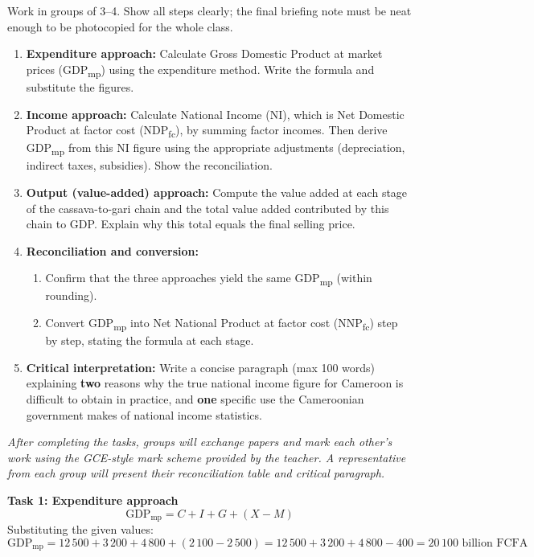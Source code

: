 \documentclass[11pt]{article}
\newcounter{popsec}
\newcounter{popsub}
\newcommand{\courssub}[1]{%
  \stepcounter{popsub}%
  \par\vspace{9pt}\noindent{\popxbold\fontsize{11.5}{13}\selectfont\color{popink}{\color{poporange}\thepopsec.\thepopsub}\hspace{6pt}#1}\par\nopagebreak\vspace{4pt}
}
\begin{document}
\courssub{Tasks}
Work in groups of 3--4. Show all steps clearly; the final briefing note must be neat enough to be photocopied for the whole class.

\begin{enumerate}
    \item \textbf{Expenditure approach:} Calculate Gross Domestic Product at market prices (GDP\textsubscript{mp}) using the expenditure method. Write the formula and substitute the figures.
    \item \textbf{Income approach:} Calculate National Income (NI), which is Net Domestic Product at factor cost (NDP\textsubscript{fc}), by summing factor incomes. Then derive GDP\textsubscript{mp} from this NI figure using the appropriate adjustments (depreciation, indirect taxes, subsidies). Show the reconciliation.
    \item \textbf{Output (value-added) approach:} Compute the value added at each stage of the cassava-to-gari chain and the total value added contributed by this chain to GDP. Explain why this total equals the final selling price.
    \item \textbf{Reconciliation and conversion:} 
          \begin{enumerate}
              \item Confirm that the three approaches yield the same GDP\textsubscript{mp} (within rounding).
              \item Convert GDP\textsubscript{mp} into Net National Product at factor cost (NNP\textsubscript{fc}) step by step, stating the formula at each stage.
          \end{enumerate}
    \item \textbf{Critical interpretation:} Write a concise paragraph (max 100 words) explaining \textbf{two} reasons why the true national income figure for Cameroon is difficult to obtain in practice, and \textbf{one} specific use the Cameroonian government makes of national income statistics.
\end{enumerate}

\emph{After completing the tasks, groups will exchange papers and mark each other's work using the GCE-style mark scheme provided by the teacher. A representative from each group will present their reconciliation table and critical paragraph.}

\courssub{Model answer}

\textbf{Task 1: Expenditure approach}
\[
\text{GDP}_{\text{mp}} = C + I + G + (X - M)
\]
Substituting the given values:
\[
\text{GDP}_{\text{mp}} = 12\,500 + 3\,200 + 4\,800 + (2\,100 - 2\,500) = 12\,500 + 3\,200 + 4\,800 - 400 = \boxed{20\,100 \text{ billion FCFA}}
\]
\end{document}
